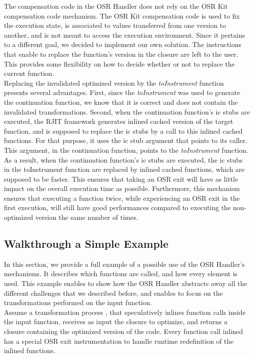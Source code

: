 The compensation code in the OSR Handler does not rely on the OSR Kit compensation code mechanism.
The OSR Kit compensation code is used to fix the execution state, is associated to values transferred from one version to another, and is not meant to access the execution environment.
Since it pertains to a different goal, we decided to implement our own solution.
The instructions that enable to replace the function's version in the closure are left to the user. 
This provides some flexibility on how to decide whether or not to replace the current function.\\

Replacing the invalidated optimized version by the \textit{toInstrument} function presents several advantages.
First, since the \textit{toInstrument} was used to generate the continuation function, we know that it is correct and does not contain the invalidated transformations.
Second, when the continuation function's ic stubs are executed, the RJIT framework generates inlined cached version of the target function, and is supposed to replace the ic stubs by a call to this inlined cached functions.
For that purpose, it uses the ic stub argument that points to its caller.
This argument, in the continuation function, points to the \textit{toInstrument} function.
As a result, when the continuation function's ic stubs are executed, the ic stubs in the toInstrument function are replaced by inlined cached functions, which are supposed to be faster.
This ensures that taking an OSR exit will have as little impact on the overall execution time as possible.
Furthermore, this mechanism ensures that executing a function twice, while experiencing an OSR exit in the first execution, will still have good performances compared to executing the non-optimized version the same number of times.\\

\subsection{Walkthrough a Simple Example}
In this section, we provide a full example of a possible use of the OSR Handler's mechanisms.
It describes which functions are called, and how every element is used.
This example enables to show how the OSR Handler abstracts away all the different challenges that we described before, and enables to focus on the transformations performed on the input function.\\

Assume a transformation process , that speculatively inlines function calls inside the input function. 
 receives as input the closure to optimize, and returns a closure containing the optimized version of the code.
Every function call inlined has a special OSR exit instrumentation to handle runtime redefinition of the inlined functions.\\

